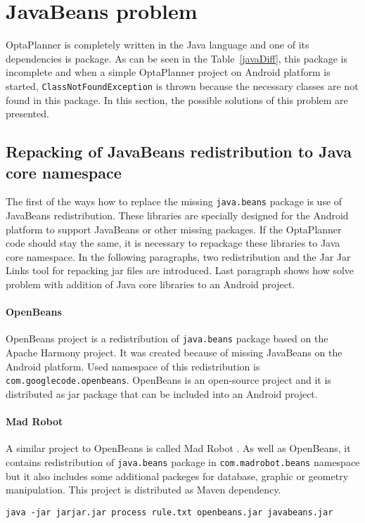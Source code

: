 \section{JavaBeans problem}\label{JavaBeans}
OptaPlanner is completely written in the Java language and one of its dependencies is package. As can be seen in the Table~\ref{javaDiff}, this package is incomplete and when a simple OptaPlanner project on Android platform is started, \texttt{ClassNotFoundException} is thrown because the necessary classes are not found in this package. In this section, the possible solutions of this problem are presented.

\subsection{Repacking of JavaBeans redistribution to Java core namespace}
The first of the ways how to replace the missing \texttt{java.beans} package is use of JavaBeans redistribution. These libraries are specially designed for the Android platform to support JavaBeans or other missing packages. If the OptaPlanner code should stay the same, it is necessary to repackage these libraries to Java core namespace. In the following paragraphs, two redistribution and the Jar Jar Links tool for repacking jar files are introduced. Last paragraph shows how solve problem with addition of Java core libraries to an Android project. 

\paragraph{OpenBeans}
OpenBeans project \cite{OpenBeans} is a redistribution of \texttt{java.beans} package based on the Apache Harmony project. It was created because of missing JavaBeans on the Android platform. Used namespace of this redistribution is \texttt{com.googlecode.openbeans}. OpenBeans is an open-source project and it is distributed as jar package that can be included into an Android project. 

\paragraph{Mad Robot}
A similar project to OpenBeans is called Mad Robot \cite{MadRobot}. As well as OpenBeans, it contains redistribution of \texttt{java.beans} package in \texttt{com.madrobot.beans} namespace but it also includes some additional packeges for database, graphic or geometry manipulation. This project is distributed as Maven dependency.
\\
\begin{lstlisting}[captionpos={b},caption={Command for repacking openbeans.jar file},frame={lines},label={command},basicstyle=\footnotesize]
java -jar jarjar.jar process rule.txt openbeans.jar javabeans.jar
\end{lstlisting}

